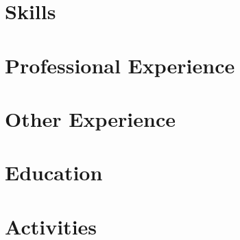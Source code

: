 \documentclass[letter,10pt]{article}
\begin{document}


\section{Skills}


\section{Professional Experience}


\section{Other Experience}


\section{Education}


\section{Activities}

\end{document}
